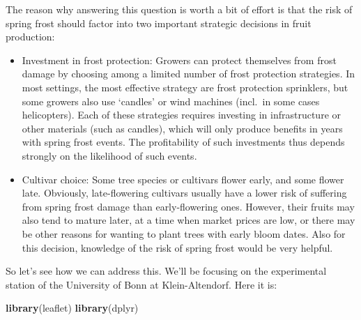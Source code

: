 \documentclass[
]{book}
\newenvironment{Shaded}{\begin{snugshade}}{\end{snugshade}}
\newcommand{\DataTypeTok}[1]{\textcolor[rgb]{0.13,0.29,0.53}{#1}}
\newcommand{\DecValTok}[1]{\textcolor[rgb]{0.00,0.00,0.81}{#1}}
\newcommand{\FloatTok}[1]{\textcolor[rgb]{0.00,0.00,0.81}{#1}}
\newcommand{\KeywordTok}[1]{\textcolor[rgb]{0.13,0.29,0.53}{\textbf{#1}}}
\newcommand{\NormalTok}[1]{#1}
\newcommand{\OperatorTok}[1]{\textcolor[rgb]{0.81,0.36,0.00}{\textbf{#1}}}
\newcommand{\StringTok}[1]{\textcolor[rgb]{0.31,0.60,0.02}{#1}}
\providecommand{\tightlist}{%
  \setlength{\itemsep}{0pt}\setlength{\parskip}{0pt}}
\begin{document}
The reason why answering this question is worth a bit of effort is that the risk of spring frost should factor into two important strategic decisions in fruit production:

\begin{itemize}
\tightlist
\item
  Investment in frost protection: Growers can protect themselves from frost damage by choosing among a limited number of frost protection strategies. In most settings, the most effective strategy are frost protection sprinklers, but some growers also use `candles' or wind machines (incl.~in some cases helicopters). Each of these strategies requires investing in infrastructure or other materials (such as candles), which will only produce benefits in years with spring frost events. The profitability of such investments thus depends strongly on the likelihood of such events.
\item
  Cultivar choice: Some tree species or cultivars flower early, and some flower late. Obviously, late-flowering cultivars usually have a lower risk of suffering from spring frost damage than early-flowering ones. However, their fruits may also tend to mature later, at a time when market prices are low, or there may be other reasons for wanting to plant trees with early bloom dates. Also for this decision, knowledge of the risk of spring frost would be very helpful.
\end{itemize}

So let's see how we can address this. We'll be focusing on the experimental station of the University of Bonn at Klein-Altendorf. Here it is:

\begin{Shaded}
\begin{Highlighting}[]
\KeywordTok{library}\NormalTok{(leaflet)}
\KeywordTok{library}\NormalTok{(dplyr)}
\end{Highlighting}
\end{Shaded}

\begin{Shaded}
\end{Shaded}
\end{document}
